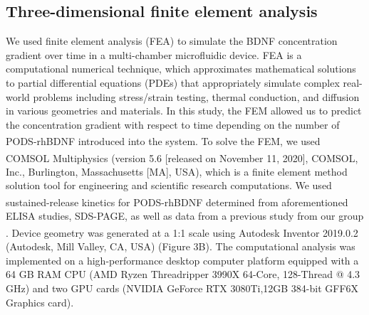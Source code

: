 \documentclass[review]{elsarticle}
\begin{document}
\subsection{Three-dimensional finite element analysis}
We used finite element analysis (FEA) to simulate the BDNF concentration gradient over time in a multi-chamber microfluidic device. FEA is a computational numerical technique, which approximates mathematical solutions to partial differential equations (PDEs) that appropriately simulate complex real-world problems including stress/strain testing, thermal conduction, and diffusion in various geometries and materials. In this study, the FEM allowed us to predict the concentration gradient with respect to time depending on the number of PODS\textsuperscript{\textregistered}-rhBDNF introduced into the system. To solve the FEM, we used COMSOL\textsuperscript{\textregistered} Multiphysics (version 5.6 [released on November 11, 2020], COMSOL, Inc., Burlington, Massachusetts [MA], USA), which is a finite element method solution tool for engineering and scientific research computations. We used sustained-release kinetics for PODS\textsuperscript{\textregistered}-rhBDNF determined from aforementioned ELISA studies, SDS-PAGE, as well as data from a previous study from our group \cite{Chang2020}. Device geometry was generated at a 1:1 scale using Autodesk\textsuperscript{\textregistered} Inventor 2019.0.2 (Autodesk, Mill Valley, CA, USA) (Figure 3B). The computational analysis was implemented on a high-performance desktop computer platform equipped with a 64 GB RAM CPU (AMD Ryzen Threadripper 3990X 64-Core, 128-Thread @ 4.3 GHz) and two GPU cards (NVIDIA GeForce RTX 3080Ti,12GB 384-bit GFF6X Graphics card).
\end{document}
